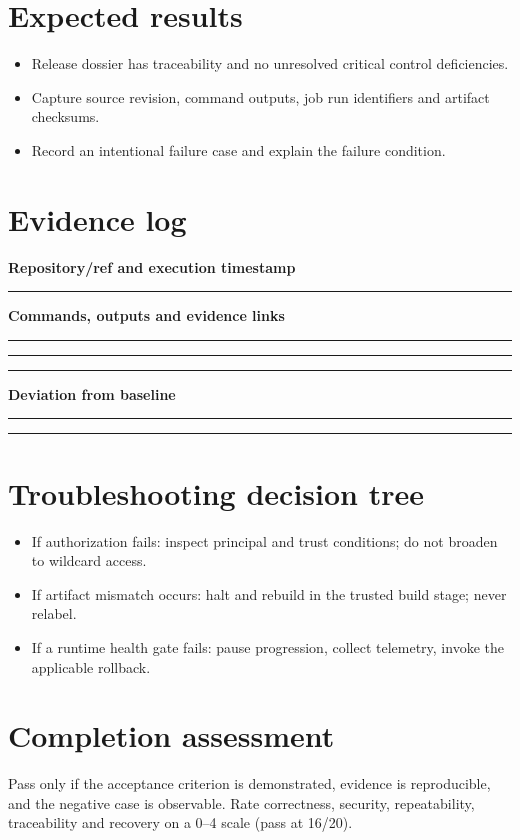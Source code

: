 \documentclass[10pt,letterpaper]{article}
\begin{document}
\section{Expected results}
\begin{itemize}
\item Release dossier has traceability and no unresolved critical control deficiencies.
\item Capture source revision, command outputs, job run identifiers and artifact checksums.
\item Record an intentional failure case and explain the failure condition.
\end{itemize}

\section{Evidence log}
\textbf{Repository/ref and execution timestamp}\par
\noindent\rule{\linewidth}{0.35pt}\par\vspace{0.7em}
\textbf{Commands, outputs and evidence links}\par
\noindent\rule{\linewidth}{0.35pt}\par\vspace{0.7em}
\noindent\rule{\linewidth}{0.35pt}\par\vspace{0.7em}
\noindent\rule{\linewidth}{0.35pt}\par\vspace{0.7em}
\textbf{Deviation from baseline}\par
\noindent\rule{\linewidth}{0.35pt}\par\vspace{0.7em}
\noindent\rule{\linewidth}{0.35pt}\par\vspace{0.7em}

\section{Troubleshooting decision tree}
\begin{itemize}
\item If authorization fails: inspect principal and trust conditions; do not broaden to wildcard access.
\item If artifact mismatch occurs: halt and rebuild in the trusted build stage; never relabel.
\item If a runtime health gate fails: pause progression, collect telemetry, invoke the applicable rollback.
\end{itemize}

\section{Completion assessment}
Pass only if the acceptance criterion is demonstrated, evidence is reproducible, and the negative case is observable. Rate correctness, security, repeatability, traceability and recovery on a 0--4 scale (pass at 16/20).
\end{document}
